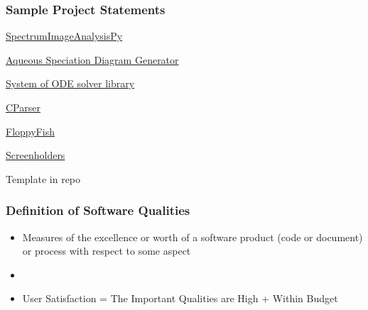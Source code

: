 \documentclass[t,12pt,numbers,fleqn]{beamer}
\begin{document}
\begin{frame}
\frametitle{Sample Project Statements} 

\bi
\item
  \href{https://github.com/icbicket/SpectrumImageAnalysisPy/blob/master/Doc/ProblemStatement/ProblemStatement.tex}
  {SpectrumImageAnalysisPy}
\item
  \href{https://github.com/palmerst/cas741_sp/blob/master/Doc/ProblemStatement/ProblemStatement.pdf}{Aqueous
    Speciation Diagram Generator}
\item
  \href{https://github.com/aoananp/cas741/blob/master/Doc/ProblemStatement/ProblemStatement.pdf}{System
    of ODE solver library}
\item \href{https://gitlab.cas.mcmaster.ca/ThisTooShallParse/3XA3_CParser}{CParser}
\item \href{https://gitlab.cas.mcmaster.ca/theateam/FloppyFishGroup}{FloppyFish}
\item
  \href{https://gitlab.cas.mcmaster.ca/screenholders/screenholders}{Screenholders}
\item Template in repo
\ei

\end{frame}


\begin{frame}
\frametitle{Definition of Software Qualities}

\begin{itemize}
\item Measures of the excellence or worth of a software product (code or document) or process
with respect to some aspect
\item {}
\item User Satisfaction = The Important Qualities are High + Within Budget
\end{itemize}
\end{frame}

\end{document}
